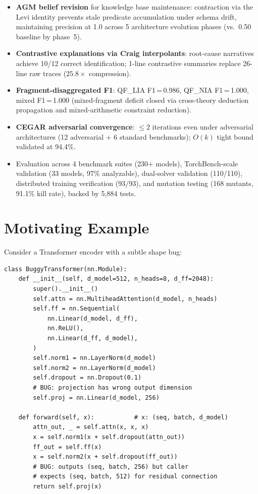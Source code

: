 \documentclass[11pt]{article}
\begin{document}
\begin{itemize}[leftmargin=2em]
    operators ($1.33\times$ more shape transfer functions),
    adding scaled dot-product attention, RoPE, einops rearrange/repeat/reduce,
    Conv3d, ConvTranspose1d, adaptive pooling, and 42 further operator families.
  \item \textbf{AGM belief revision} for knowledge base maintenance:
    contraction via the Levi identity prevents stale predicate
    accumulation under schema drift, maintaining precision at 1.0
    across 5 architecture evolution phases (vs.\ 0.50 baseline by phase~5).
  \item \textbf{Contrastive explanations via Craig interpolants}:
    root-cause narratives achieve 10/12 correct identification;
    1-line contrastive summaries replace 26-line raw traces
    ($25.8\times$ compression).
  \item \textbf{Fragment-disaggregated F1}: QF\_LIA F1\,=\,0.986,
    QF\_NIA F1\,=\,1.000, mixed F1\,=\,1.000 (mixed-fragment deficit
    closed via cross-theory deduction propagation and
    mixed-arithmetic constraint reduction).
  \item \textbf{CEGAR adversarial convergence}: $\leq 2$ iterations
    even under adversarial architectures (12 adversarial + 6 standard
    benchmarks); $O(k)$ tight bound validated at 94.4\%.
  \item Evaluation across 4 benchmark suites (230+ models),
    TorchBench-scale validation (33 models, 97\% analyzable),
    dual-solver validation (110/110), distributed training verification
    (93/93), and mutation testing (168 mutants, 91.1\% kill rate),
    backed by 5,884 tests.
\end{itemize}


\section{Motivating Example}\label{sec:motivating}

Consider a Transformer encoder with a subtle shape bug:

\begin{lstlisting}[caption={A Transformer with a cross-domain shape bug.},label={lst:motiv}]
class BuggyTransformer(nn.Module):
    def __init__(self, d_model=512, n_heads=8, d_ff=2048):
        super().__init__()
        self.attn = nn.MultiheadAttention(d_model, n_heads)
        self.ff = nn.Sequential(
            nn.Linear(d_model, d_ff),
            nn.ReLU(),
            nn.Linear(d_ff, d_model),
        )
        self.norm1 = nn.LayerNorm(d_model)
        self.norm2 = nn.LayerNorm(d_model)
        self.dropout = nn.Dropout(0.1)
        # BUG: projection has wrong output dimension
        self.proj = nn.Linear(d_model, 256)

    def forward(self, x):           # x: (seq, batch, d_model)
        attn_out, _ = self.attn(x, x, x)
        x = self.norm1(x + self.dropout(attn_out))
        ff_out = self.ff(x)
        x = self.norm2(x + self.dropout(ff_out))
        # BUG: outputs (seq, batch, 256) but caller
        # expects (seq, batch, 512) for residual connection
        return self.proj(x)
\end{lstlisting}
\end{document}
